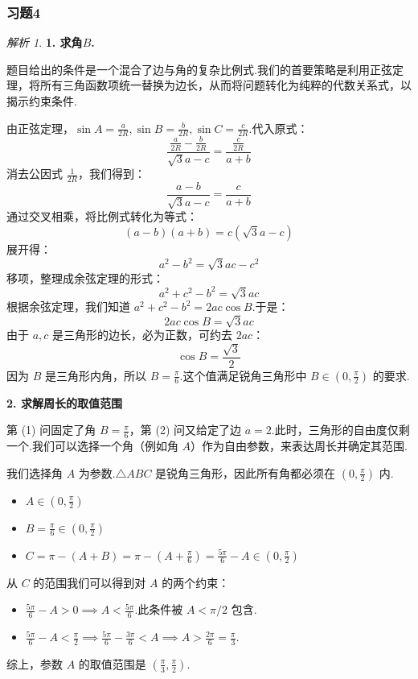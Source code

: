 \documentclass[12pt,a4paper]{ctexbook}
\theoremstyle{definition}
\theoremstyle{remark}
\newtheorem*{solution}{解析}
\begin{document}
	\subsubsection{习题4}
	\begin{solution}
		\textbf{1. 求角$B$.}
		
		题目给出的条件是一个混合了边与角的复杂比例式.我们的首要策略是利用正弦定理，将所有三角函数项统一替换为边长，从而将问题转化为纯粹的代数关系式，以揭示约束条件.
		
		由正弦定理，$\sin A = \frac{a}{2R}, \sin B = \frac{b}{2R}, \sin C = \frac{c}{2R}$.代入原式：
		\[
		\frac{\frac{a}{2R} - \frac{b}{2R}}{\sqrt{3}a - c} = \frac{\frac{c}{2R}}{a+b}
		\]
		消去公因式 $\frac{1}{2R}$，我们得到：
		\[
		\frac{a-b}{\sqrt{3}a - c} = \frac{c}{a+b}
		\]
		通过交叉相乘，将比例式转化为等式：
		\[
		(a-b)(a+b) = c(\sqrt{3}a - c)
		\]
		展开得：
		\[
		a^2 - b^2 = \sqrt{3}ac - c^2
		\]
		移项，整理成余弦定理的形式：
		\[
		a^2 + c^2 - b^2 = \sqrt{3}ac
		\]
		根据余弦定理，我们知道 $a^2 + c^2 - b^2 = 2ac\cos B$.于是：
		\[
		2ac\cos B = \sqrt{3}ac
		\]
		由于 $a,c$ 是三角形的边长，必为正数，可约去 $2ac$：
		\[
		\cos B = \frac{\sqrt{3}}{2}
		\]
		因为 $B$ 是三角形内角，所以 $B = \frac{\pi}{6}$.这个值满足锐角三角形中 $B \in (0, \frac{\pi}{2})$ 的要求.
		
		\textbf{2. 求解周长的取值范围}
		
		第 (1) 问固定了角 $B=\frac{\pi}{6}$，第 (2) 问又给定了边 $a=2$.此时，三角形的自由度仅剩一个.我们可以选择一个角（例如角 $A$）作为自由参数，来表达周长并确定其范围.
		
	我们选择角 $A$ 为参数.$\triangle ABC$ 是锐角三角形，因此所有角都必须在 $(0, \frac{\pi}{2})$ 内.
		\begin{itemize}
			\item $A \in (0, \frac{\pi}{2})$
			\item $B = \frac{\pi}{6} \in (0, \frac{\pi}{2})$ 
			\item $C = \pi - (A+B) = \pi - (A+\frac{\pi}{6}) = \frac{5\pi}{6} - A \in (0, \frac{\pi}{2})$
		\end{itemize}
		从 $C$ 的范围我们可以得到对 $A$ 的两个约束：
		\begin{itemize}
			\item $\frac{5\pi}{6} - A > 0 \implies A < \frac{5\pi}{6}$.此条件被 $A < \pi/2$ 包含.
			\item $\frac{5\pi}{6} - A < \frac{\pi}{2} \implies \frac{5\pi}{6} - \frac{3\pi}{6} < A \implies A > \frac{2\pi}{6} = \frac{\pi}{3}$.
		\end{itemize}
		综上，参数 $A$ 的取值范围是 $(\frac{\pi}{3}, \frac{\pi}{2})$.
		

\end{solution}
\end{document}
